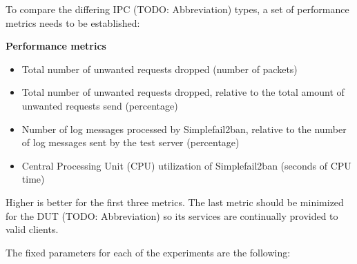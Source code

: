 \noindent
To compare the differing IPC (TODO: Abbreviation) types, a set of performance metrics needs to be established:

\bigskip
\noindent
\textbf{Performance metrics}
\begin{itemize}
    \item Total number of unwanted requests dropped (number of packets)
    \item Total number of unwanted requests dropped, relative to the total amount of unwanted requests send (percentage)
    \item Number of log messages processed by Simplefail2ban, relative to the number of log messages sent by the test server (percentage)
    \item Central Processing Unit (CPU) utilization of Simplefail2ban (seconds of CPU time)
\end{itemize}
Higher is better for the first three metrics.
The last metric should be minimized for the DUT (TODO: Abbreviation) so its services are continually provided to valid clients.

\bigskip
\noindent
The fixed parameters for each of the experiments are the following\@:

